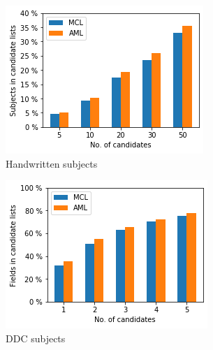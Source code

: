 \begin{figure}
  \begin{subfigure}[t]{.32\textwidth}
    \centering
    \includegraphics[width=\textwidth]{figures/supervised_approach/mcl_hw.png}
    \caption{Handwritten subjects}
    \label{fig:mcl_hw}
  \end{subfigure}
  \begin{subfigure}[t]{.32\textwidth}
    \centering
    \includegraphics[width=\textwidth]{figures/supervised_approach/mcl_ddc.png}
    \caption{DDC subjects}
    \label{fig:mcl_ddc}
  \end{subfigure}
   \begin{subfigure}[t]{.32\textwidth}
    \centering

\end{subfigure}
\end{figure}
